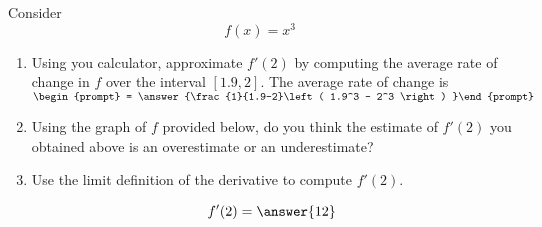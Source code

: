 \documentclass{ximera}
\author{Steven Gubkin}
\begin{document}
\begin{exercise}



Consider 
\[
f(x) = x^3
\]



\begin{enumerate}
\item Using you calculator, approximate $f'(2)$ by computing the average rate of change in $f$ over the interval $[1.9,2]$.  The average rate of change is  $\begin{prompt} = \answer{\frac{1}{1.9-2}\left( 1.9^3 - 2^3 \right) }\end{prompt}$
\item Using the graph of $f$ provided below, do you think the estimate of $f'(2)$ you obtained above is an overestimate or an underestimate?

\begin{prompt}
\begin{multipleChoice}
\end{multipleChoice}
\end{prompt}

\begin{image}
\end{image}

\item Use the limit definition of the derivative to compute $f'(2)$.  \begin{prompt}$$f'(2) = \answer{12}$$\end{prompt}
\end{enumerate}
\end{exercise}
\end{document}
